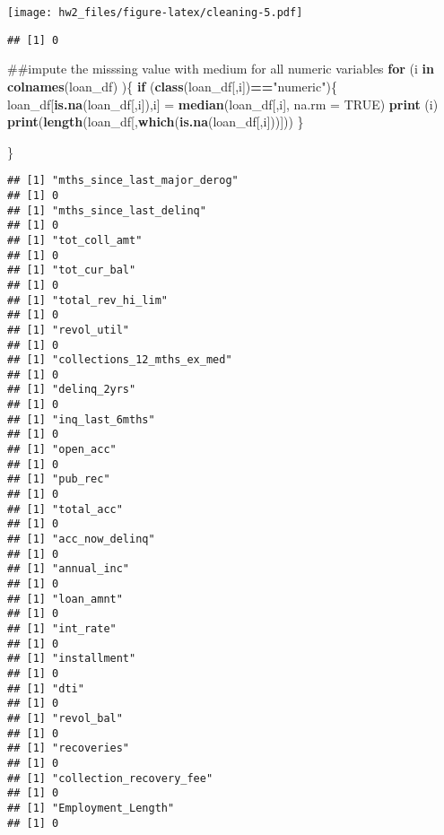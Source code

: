 \documentclass[]{article}
\newenvironment{Shaded}{\begin{snugshade}}{\end{snugshade}}
\newcommand{\KeywordTok}[1]{\textcolor[rgb]{0.13,0.29,0.53}{\textbf{#1}}}
\newcommand{\DataTypeTok}[1]{\textcolor[rgb]{0.13,0.29,0.53}{#1}}
\newcommand{\StringTok}[1]{\textcolor[rgb]{0.31,0.60,0.02}{#1}}
\newcommand{\OtherTok}[1]{\textcolor[rgb]{0.56,0.35,0.01}{#1}}
\newcommand{\ControlFlowTok}[1]{\textcolor[rgb]{0.13,0.29,0.53}{\textbf{#1}}}
\newcommand{\OperatorTok}[1]{\textcolor[rgb]{0.81,0.36,0.00}{\textbf{#1}}}
\newcommand{\NormalTok}[1]{#1}
\begin{document}
\texttt{[image: hw2\_files/figure-latex/cleaning-5.pdf]}

\begin{Shaded}
\end{Shaded}

\begin{verbatim}
## [1] 0
\end{verbatim}

\begin{Shaded}
\begin{Highlighting}[]
\NormalTok{##impute the misssing value with medium for all numeric variables}
\ControlFlowTok{for}\NormalTok{ (i }\ControlFlowTok{in} \KeywordTok{colnames}\NormalTok{(loan_df) )\{}
  \ControlFlowTok{if}\NormalTok{ (}\KeywordTok{class}\NormalTok{(loan_df[,i])}\OperatorTok{==}\StringTok{"numeric"}\NormalTok{)\{}
\NormalTok{    loan_df[}\KeywordTok{is.na}\NormalTok{(loan_df[,i]),i] =}\StringTok{ }\KeywordTok{median}\NormalTok{(loan_df[,i], }\DataTypeTok{na.rm =} \OtherTok{TRUE}\NormalTok{)}
    \KeywordTok{print}\NormalTok{ (i)}
    \KeywordTok{print}\NormalTok{(}\KeywordTok{length}\NormalTok{(loan_df[,}\KeywordTok{which}\NormalTok{(}\KeywordTok{is.na}\NormalTok{(loan_df[,i]))]))}
\NormalTok{  \}}

\NormalTok{\}}
\end{Highlighting}
\end{Shaded}

\begin{verbatim}
## [1] "mths_since_last_major_derog"
## [1] 0
## [1] "mths_since_last_delinq"
## [1] 0
## [1] "tot_coll_amt"
## [1] 0
## [1] "tot_cur_bal"
## [1] 0
## [1] "total_rev_hi_lim"
## [1] 0
## [1] "revol_util"
## [1] 0
## [1] "collections_12_mths_ex_med"
## [1] 0
## [1] "delinq_2yrs"
## [1] 0
## [1] "inq_last_6mths"
## [1] 0
## [1] "open_acc"
## [1] 0
## [1] "pub_rec"
## [1] 0
## [1] "total_acc"
## [1] 0
## [1] "acc_now_delinq"
## [1] 0
## [1] "annual_inc"
## [1] 0
## [1] "loan_amnt"
## [1] 0
## [1] "int_rate"
## [1] 0
## [1] "installment"
## [1] 0
## [1] "dti"
## [1] 0
## [1] "revol_bal"
## [1] 0
## [1] "recoveries"
## [1] 0
## [1] "collection_recovery_fee"
## [1] 0
## [1] "Employment_Length"
## [1] 0
\end{verbatim}
\end{document}
